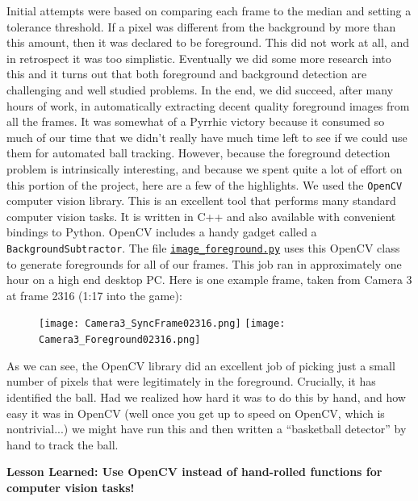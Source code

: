 \documentclass{article}
\begin{document}
Initial attempts were based on comparing each frame to the median and setting a tolerance threshold.
If a pixel was different from the background by more than this amount, then it was declared to be foreground.
This did not work at all, and in retrospect it was too simplistic.
Eventually we did some more research into this and it turns out that both foreground and background detection
are challenging and well studied problems.  
In the end, we did succeed, after many hours of work, in automatically extracting 
decent quality foreground images from all the frames.  
It was somewhat of a Pyrrhic victory because it consumed so much of our time that we didn't
really have much time left to see if we could use them for automated ball tracking.
However, because the foreground detection problem is intrinsically interesting,
and because we spent quite a lot of effort on this portion of the project, here are a few of the highlights.
We used the \texttt{OpenCV} computer vision library.  
This is an excellent tool that performs many standard computer vision tasks.  
It is written in C++ and also available with convenient bindings to Python.
OpenCV includes a handy gadget called a \texttt{BackgroundSubtractor}.
The file 
\href{https://github.com/Harvard-AM-205-Basketball/Basketball/blob/master/src/image_foreground.py}
{\texttt{image\_foreground.py}}
uses this OpenCV class to generate foregrounds
for all of our frames.  This job ran in approximately one hour on a high end desktop PC.
Here is one example frame, taken from Camera 3 at frame 2316 (1:17 into the game):
\begin{figure}[H]
\center
\texttt{[image: Camera3\_SyncFrame02316.png]}
\texttt{[image: Camera3\_Foreground02316.png]}
\end{figure}

As we can see, the OpenCV library did an excellent job of picking just a small number 
of pixels that were legitimately in the foreground.  Crucially, it has identified the ball.
Had we realized how hard it was to do this by hand, and how easy it was in OpenCV
(well once you get up to speed on OpenCV, which is nontrivial...)
we might have run this and then written a ``basketball detector'' by hand to track the ball.

\textbf{Lesson Learned: Use OpenCV instead of hand-rolled functions for computer vision tasks!}

\newpage
\end{document}
